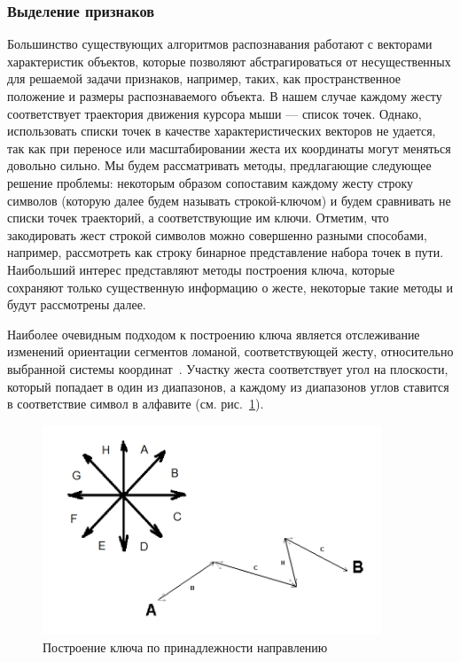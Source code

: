 \documentclass[a5paper]{article}
\begin{document}
\subsubsection{Выделение признаков}
Большинство существующих алгоритмов распознавания работают с векторами характеристик объектов, которые позволяют абстрагироваться от несущественных для решаемой задачи признаков, например, таких, как пространственное положение и размеры распознаваемого объекта. В нашем случае каждому жесту соответствует траектория движения курсора мыши --- список точек. Однако, использовать списки точек в качестве характеристических векторов не удается, так как при переносе или масштабировании жеста их координаты могут меняться довольно сильно. Мы будем рассматривать методы, предлагающие следующее решение проблемы: некоторым образом сопоставим каждому жесту строку символов (которую далее будем называть строкой-ключом) и будем сравнивать не списки точек траекторий, а соответствующие им ключи. Отметим, что закодировать жест строкой символов можно совершенно разными способами, например, рассмотреть как строку бинарное представление набора точек в пути. Наибольший интерес представляют методы построения ключа, которые сохраняют только существенную информацию о жесте, некоторые такие методы и будут рассмотрены далее.

Наиболее очевидным подходом к построению ключа является отслеживание изменений ориентации сегментов ломаной, соответствующей жесту, относительно выбранной системы координат~\cite{chaosAlgorithm}. Участку жеста соответствует угол на плоскости, который попадает в один из диапазонов, а каждому из диапазонов углов ставится в соответствие символ в алфавите (см. рис.~\ref{chaos}). 

\begin{figure} [ht]
  \begin{center}
    \includegraphics[width=0.9\textwidth, bb=0 0 804 498]{02-chaos.png}
    \caption{Построение ключа по принадлежности направлению}
    \label{chaos}
  \end{center}
\end{figure}
\end{document}
